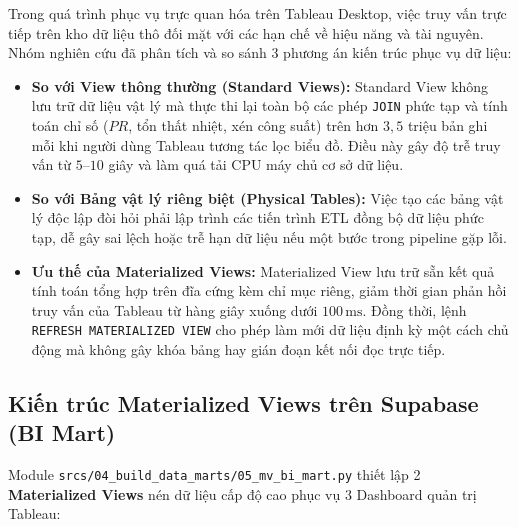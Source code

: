 \documentclass[12pt, a4paper]{report}
\begin{document}
Trong quá trình phục vụ trực quan hóa trên Tableau Desktop, việc truy vấn trực tiếp trên kho dữ liệu thô đối mặt với các hạn chế về hiệu năng và tài nguyên. Nhóm nghiên cứu đã phân tích và so sánh 3 phương án kiến trúc phục vụ dữ liệu:

\begin{itemize}[leftmargin=*]
    \item \textbf{So với View thông thường (Standard Views):} Standard View không lưu trữ dữ liệu vật lý mà thực thi lại toàn bộ các phép \texttt{JOIN} phức tạp và tính toán chỉ số ($PR$, tổn thất nhiệt, xén công suất) trên hơn $3{,}5$ triệu bản ghi mỗi khi người dùng Tableau tương tác lọc biểu đồ. Điều này gây độ trễ truy vấn từ $5$--$10$ giây và làm quá tải CPU máy chủ cơ sở dữ liệu.
    \item \textbf{So với Bảng vật lý riêng biệt (Physical Tables):} Việc tạo các bảng vật lý độc lập đòi hỏi phải lập trình các tiến trình ETL đồng bộ dữ liệu phức tạp, dễ gây sai lệch hoặc trễ hạn dữ liệu nếu một bước trong pipeline gặp lỗi.
    \item \textbf{Ưu thế của Materialized Views:} Materialized View lưu trữ sẵn kết quả tính toán tổng hợp trên đĩa cứng kèm chỉ mục riêng, giảm thời gian phản hồi truy vấn của Tableau từ hàng giây xuống dưới $100\,\text{ms}$. Đồng thời, lệnh \texttt{REFRESH MATERIALIZED VIEW} cho phép làm mới dữ liệu định kỳ một cách chủ động mà không gây khóa bảng hay gián đoạn kết nối đọc trực tiếp.
\end{itemize}

\subsection{Kiến trúc Materialized Views trên Supabase (BI Mart)}

Module \texttt{srcs/04\_build\_data\_marts/05\_mv\_bi\_mart.py} thiết lập 2 \textbf{Materialized Views} nén dữ liệu cấp độ cao phục vụ 3 Dashboard quản trị Tableau:
\end{document}
